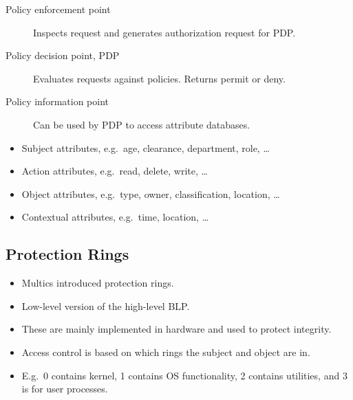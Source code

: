 \documentclass{beamer}
\begin{document}
\begin{frame}
  \begin{definition}
    \begin{description}
      \item[Policy enforcement point] Inspects request and generates 
        authorization request for PDP.
      \item[Policy decision point, PDP] Evaluates requests against policies.
        Returns permit or deny.
      \item[Policy information point] Can be used by PDP to access attribute 
        databases.
    \end{description}
  \end{definition}
\end{frame}

\begin{frame}
  \begin{example}[Attributes]
    \begin{itemize}
      \item Subject attributes, e.g.\ age, clearance, department, role, \dots
      \item Action attributes, e.g.\ read, delete, write, \dots
      \item Object attributes, e.g.\ type, owner, classification, location, 
        \dots
      \item Contextual attributes, e.g.\ time, location, \dots
    \end{itemize}
  \end{example}
\end{frame}

\subsection{Protection Rings}

\begin{frame}
  \begin{itemize}
    \item Multics introduced protection rings.

    \item Low-level version of the high-level BLP.

    \item These are mainly implemented in hardware and used to protect 
      integrity.

    \item Access control is based on which rings the subject and object are in.

    \item E.g.\ 0 contains kernel, 1 contains OS functionality, 2 contains 
      utilities, and 3 is for user processes.

  \end{itemize}
\end{frame}
\end{document}
